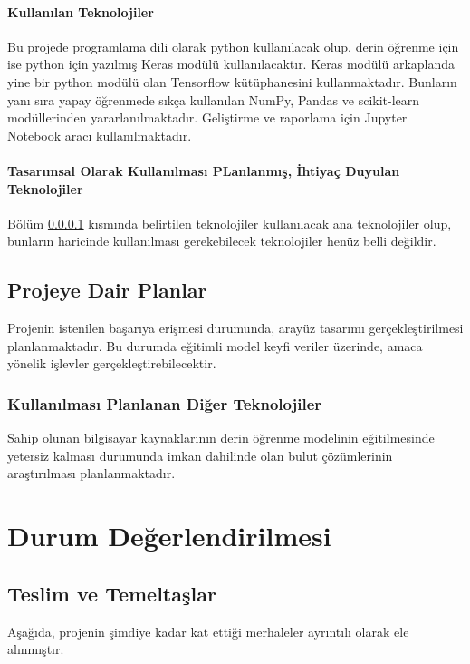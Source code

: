 \documentclass[12pt,a4paper]{article}
\begin{document}
    \paragraph{Kullanılan Teknolojiler} \label{tech}
    Bu projede programlama dili olarak python kullanılacak olup, derin öğrenme için ise python için yazılmış Keras modülü kullanılacaktır.
    Keras modülü arkaplanda yine bir python modülü olan Tensorflow kütüphanesini kullanmaktadır. Bunların yanı sıra yapay öğrenmede sıkça kullanılan
    NumPy, Pandas ve scikit-learn modüllerinden yararlanılmaktadır.
    Geliştirme ve raporlama için Jupyter Notebook aracı kullanılmaktadır.

    \paragraph{Tasarımsal Olarak Kullanılması PLanlanmış, İhtiyaç Duyulan Teknolojiler}
    Bölüm \ref{tech} kısmında belirtilen teknolojiler kullanılacak ana teknolojiler olup, bunların haricinde kullanılması gerekebilecek teknolojiler
    henüz belli değildir.

    \subsection{Projeye Dair Planlar}
    Projenin istenilen başarıya erişmesi durumunda, arayüz tasarımı gerçekleştirilmesi planlanmaktadır.
    Bu durumda eğitimli model keyfi veriler üzerinde, amaca yönelik işlevler gerçekleştirebilecektir.

    \subsubsection{Kullanılması Planlanan Diğer Teknolojiler}
    Sahip olunan bilgisayar kaynaklarının derin öğrenme modelinin eğitilmesinde yetersiz kalması durumunda imkan dahilinde olan bulut çözümlerinin
    araştırılması planlanmaktadır.
    
    \section{Durum Değerlendirilmesi}

    \subsection{Teslim ve Temeltaşlar}
    Aşağıda, projenin şimdiye kadar kat ettiği merhaleler ayrıntılı olarak ele alınmıştır.
\end{document}
